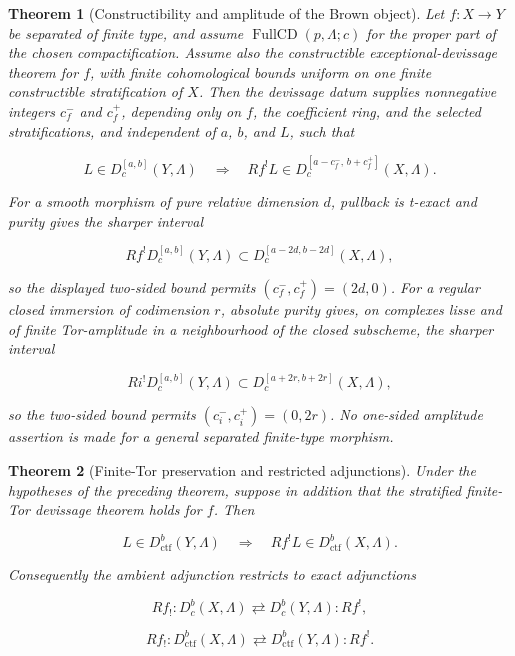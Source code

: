 \documentclass[10pt]{article}
\newtheorem{theorem}{Theorem}[section]
\theoremstyle{definition}
\newcommand{\Dbc}{D^b_c}
\newcommand{\Dctf}{D^b_{\mathrm{ctf}}}
\begin{document}
\begin{theorem}[Constructibility and amplitude of the Brown object]
Let \(f:X\to Y\) be separated of finite type, and assume
\(\operatorname{FullCD}(p,\Lambda;c)\) for the proper part of the chosen
compactification.  Assume also the constructible exceptional-devissage
theorem for \(f\), with finite cohomological bounds uniform on one finite
constructible stratification of \(X\).  Then the devissage datum supplies
nonnegative integers \(c_f^-\) and \(c_f^+\), depending only on \(f\), the
coefficient ring, and the selected stratifications, and independent of
\(a\), \(b\), and \(L\), such that

\[
 L\in D_c^{[a,b]}(Y,\Lambda)
 \quad\Longrightarrow\quad
 Rf^!L\in D_c^{[a-c_f^-,\,b+c_f^+]}(X,\Lambda).
\]

For a smooth morphism of pure relative dimension \(d\), pullback is
t-exact and purity gives the sharper interval

\[
 Rf^!D_c^{[a,b]}(Y,\Lambda)
 \subset D_c^{[a-2d,b-2d]}(X,\Lambda),
\]

so the displayed two-sided bound permits
\((c_f^-,c_f^+)=(2d,0)\).  For a regular closed immersion of codimension
\(r\), absolute purity gives, on complexes lisse and of finite Tor-amplitude
in a neighbourhood of the closed subscheme, the sharper interval

\[
 Ri^!D_c^{[a,b]}(Y,\Lambda)
 \subset D_c^{[a+2r,b+2r]}(X,\Lambda),
\]

so the two-sided bound permits \((c_i^-,c_i^+)=(0,2r)\).  No one-sided
amplitude assertion is made for a general separated finite-type morphism.
\end{theorem}

\begin{theorem}[Finite-Tor preservation and restricted adjunctions]
Under the hypotheses of the preceding theorem, suppose in addition that the
stratified finite-Tor devissage theorem holds for \(f\).  Then

\[
 L\in\Dctf(Y,\Lambda)\quad\Longrightarrow\quad
 Rf^!L\in\Dctf(X,\Lambda).
\]

Consequently the ambient adjunction restricts to exact adjunctions

\[
 Rf_!: \Dbc(X,\Lambda)\rightleftarrows\Dbc(Y,\Lambda):Rf^!,
\]

\[
 Rf_!: \Dctf(X,\Lambda)\rightleftarrows\Dctf(Y,\Lambda):Rf^!.
\]
\end{theorem}
\end{document}
